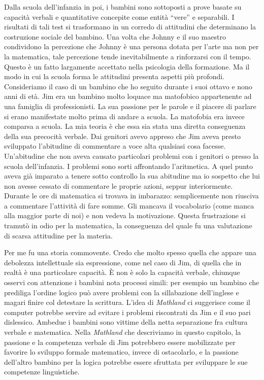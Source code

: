 Dalla scuola dell'infanzia in poi, i bambini sono sottoposti a prove basate su capacità verbali e quantitative concepite come entità “vere” e separabili. I risultati di tali test si trasformano in un corredo di attitudini che determinano la costruzione sociale del bambino. Una volta che Johnny e il suo maestro condividono la percezione che Johnny è una persona dotata per l'arte ma non per la matematica, tale percezione tende inevitabilmente a rinforzarsi con il tempo. Questo è un fatto largamente accettato nella psicologia della formazione. Ma il modo in cui la scuola forma le attitudini presenta aspetti più profondi. Consideriamo il caso di un bambino  che ho seguito durante i suoi ottavo e nono anni di età. Jim era un bambino molto loquace ma matofobico appartenente ad una famiglia di professionisti. La sua passione per le parole e il piacere di parlare si erano manifestate molto prima di andare a scuola. La matofobia era invece comparsa a scuola. La mia teoria è che essa sia stata una diretta conseguenza della sua precocità verbale. Dai genitori avevo appreso che Jim aveva presto sviluppato l'abitudine di commentare a voce alta qualsiasi cosa facesse. Un'abitudine che non aveva causato particolari problemi con i genitori o presso la scuola dell'infanzia. I problemi sono sorti affrontando l'aritmetica. A quel punto aveva già imparato a tenere sotto controllo la sua abitudine ma io sospetto che lui non avesse cessato di commentare le proprie azioni, seppur interiormente. Durante le ore di matematica si trovava in imbarazzo: semplicemente non riusciva a commentare l'attività di fare somme. Gli mancava il vocabolario (come manca alla maggior parte di noi) e non vedeva la motivazione. Questa frustrazione si tramutò in odio per la matematica, la conseguenza del quale fu una valutazione di scarsa attitudine per la materia.

Per me fu una storia commovente. Credo che molto spesso quella che appare una debolezza intellettuale sia espressione, come nel caso di Jim, di quella che in realtà è una particolare capacità. È non è solo la capacità verbale, chiunque osservi con attenzione i bambini nota processi simili: per esempio un bambino che prediliga l'ordine logico può avere problemi con la sillabazione dell'inglese e magari finire col detestare la scrittura. L'idea di \textit{Mathland} ci suggerisce come il computer potrebbe servire ad evitare i problemi riscontrati da Jim e il suo pari dislessico. Ambedue i bambini sono vittime della netta separazione fra cultura verbale e matematica. Nella \textit{Mathland} che descriviamo in questo capitolo, la passione e la competenza verbale di Jim potrebbero essere mobilizzate per favorire lo sviluppo formale matematico, invece di ostacolarlo, e la passione dell'altro bambino per la logica potrebbe essere sfruttata per sviluppare le sue competenze linguistiche.

